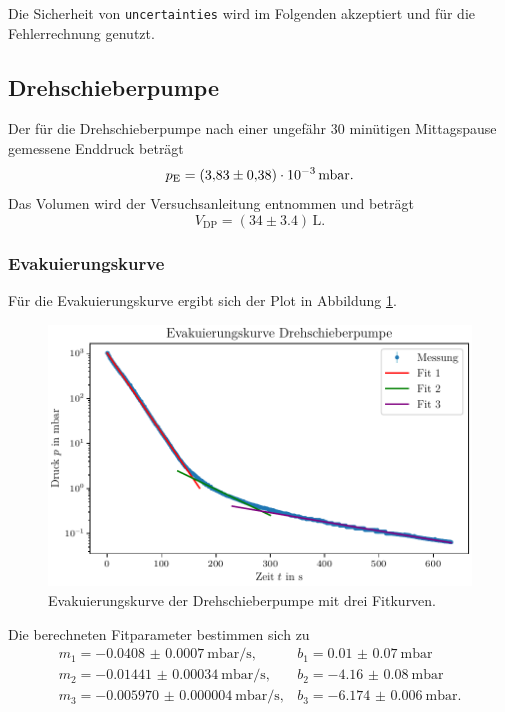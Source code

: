 Die Sicherheit von \texttt{uncertainties} wird im Folgenden akzeptiert und für die Fehlerrechnung genutzt.


\subsection{Drehschieberpumpe}

Der für die Drehschieberpumpe nach einer ungefähr 30 minütigen Mittagspause gemessene Enddruck beträgt
\begin{equation}
    p_\text{E} = (\num{3.83} \pm \num{0.38}) \cdot 10^{-3} \, \si{\milli\bar}.\\
\end{equation}
Das Volumen wird der Versuchsanleitung entnommen und beträgt
\begin{equation}
    V_\text{DP} = (\num{34} \pm \num{3.4}) \, \si{\liter}.
\end{equation}


\subsubsection{Evakuierungskurve}

Für die Evakuierungskurve ergibt sich der Plot in Abbildung \ref{fig:DP_evak}.

\begin{figure}[H]
    \centering
    \includegraphics[width=\textwidth]{plots/DP_Evakuierungskurve.pdf}
    \caption{Evakuierungskurve der Drehschieberpumpe mit drei Fitkurven.}
    \label{fig:DP_evak}
\end{figure}

Die berechneten Fitparameter bestimmen sich zu 
\begin{align}
    m_1 = \qty[separate-uncertainty=false]{-0.0408(7)}{\milli\bar\per\second}, & b_1 = \qty[separate-uncertainty=false]{0.01(7)}{\milli\bar} \\
    m_2 = \qty[separate-uncertainty=false]{-0.01441(34)}{\milli\bar\per\second}, & b_2 = \qty[separate-uncertainty=false]{-4.16(8)}{\milli\bar}\\
    m_3 = \qty[separate-uncertainty=false]{-0.005970(4)}{\milli\bar\per\second}, & b_3 = \qty[separate-uncertainty=false]{-6.174(6)}{\milli\bar}.
\end{align}

